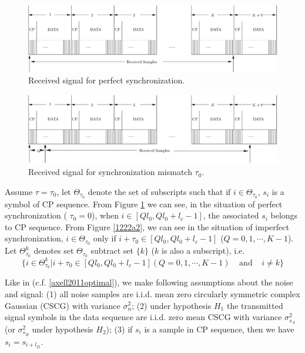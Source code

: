 \begin{figure}[!t]
  \centering 
  \includegraphics[width=\textwidth]{4/fig2.eps}
  \caption{Received signal for perfect synchronization.}
  \label{pic:1221n0}
\end{figure}

\begin{figure}[!t]
  \centering 
  \includegraphics[width=\textwidth]{4/fig3.eps}
  \caption{Received signal for synchronization mismatch $\tau_0$.}
  \label{pic:1222a2}
\end{figure}
Assume $\tau = \tau_0$, let $\Theta_{\tau_0}$ denote the set of subscripts such that if $i \in \Theta_{\tau_0}$,  $s_i$ is a symbol of CP sequence. From Figure \ref{pic:1221n0} we can see, in the situation of perfect synchronization ( $\tau_0 =0$), when $i \in [Ql_0, Ql_0+l_c-1]$, the associated $s_i$ belongs to CP sequence. 
From Figure \ref{1222a2}, we can see in the situation of imperfect synchronization, $i \in \Theta_{\tau_0}$ only if $i + \tau_0 \in [Ql_0, Ql_0+l_c -1]$ ($Q = 0, 1, \cdots, K-1$). 
Let $\Theta_{\tau_0}^k$ denotes set $\Theta_{\tau_0}$ subtract set $\{k\}$ ($k$ is also a subscript), i.e.
\begin{equation}
  \{i\in \Theta_{\tau_0}^k| i + \tau_0 \in [Ql_0, Ql_0+l_c -1] (Q = 0, 1, \cdots, K-1)\;\;\;\; \text{and}\;\;\;\; i\neq k\}
  \label{definitionof}
\end{equation}

Like in (c.f. \eqref{axell2011optimal}), we make following assumptions about the noise and signal: (1) all noise samples are i.i.d. mean zero circularly symmetric complex Gaussian (CSCG) with variance $\sigma_n^2$; (2) under hypothesis $H_1$ the transmitted signal symbols in the data sequence are i.i.d. zero mean CSCG with variance $\sigma_{s_A}^2$ (or $\sigma_{s_B}^2$ under hypothesis $H_2$); (3) if $s_i$ is a sample in CP sequence, then we have $s_i = s_{i+l_D}$. 

